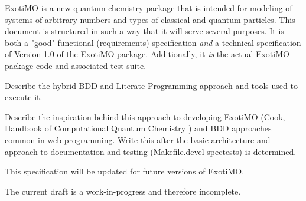 \label{Purpose}

ExotiMO is a new quantum chemistry package that is intended
for modeling of systems of arbitrary numbers and types of 
classical and quantum particles.
This document is structured in such a way that it will serve several purposes.
It is both a "good"\cite{spolsky-spec} functional (\ie requirements) 
specification \textit{and} a technical specification of Version 1.0 of the ExotiMO package.  
Additionally, it \textit{is} the actual ExotiMO package code and associated test suite.

\begin{TODO}
Describe the hybrid BDD and Literate Programming approach and tools used to execute it.
\end{TODO}

\begin{TODO}
Describe the inspiration behind this approach to developing ExotiMO (Cook, Handbook of Computational Quantum 
Chemistry \cite{cook}) and BDD approaches common in web programming.  
Write this after the basic architecture and approach to documentation and testing (Makefile.devel spectests) 
is determined.
\end{TODO}

This specification will be updated for future versions of ExotiMO.

The current draft is a work-in-progress and therefore incomplete.

